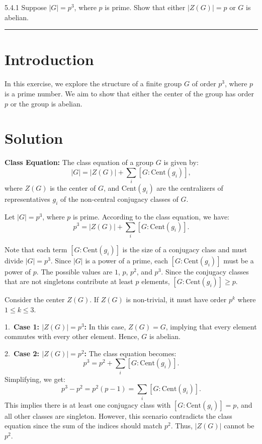 \documentclass[12pt]{amsart}
\theoremstyle{definition}
\numberwithin{equation}{section}
\begin{document}
\begin{exercise}{5.4.1} Suppose \(|G| = p^3\), where \(p\) is prime. Show that either \(|Z(G)|=p\) or \(G\) is abelian. 

    \noindent\rule{\linewidth}{1pt}

    \section*{Introduction}
    
    In this exercise, we explore the structure of a finite group \(G\) of order \(p^3\), where \(p\) is a prime number. We aim to show that either the center of the group has order \(p\) or the group is abelian.

    \section*{Solution}
    
    \noindent \textbf{Class Equation:} The class equation of a group \(G\) is given by:
    \[
    |G| = |Z(G)| + \sum_{i} [G : \text{Cent}(g_i)],
    \]
    where \(Z(G)\) is the center of \(G\), and \(\text{Cent}(g_i)\) are the centralizers of representatives \(g_i\) of the non-central conjugacy classes of \(G\).

    Let \(|G| = p^3\), where \(p\) is prime. According to the class equation, we have:
    \[
    p^3 = |Z(G)| + \sum_{i} [G : \text{Cent}(g_i)].
    \]

    Note that each term \([G : \text{Cent}(g_i)]\) is the size of a conjugacy class and must divide \(|G| = p^3\). Since \(|G|\) is a power of a prime, each \([G : \text{Cent}(g_i)]\) must be a power of \(p\). The possible values are \(1\), \(p\), \(p^2\), and \(p^3\). Since the conjugacy classes that are not singletons contribute at least \(p\) elements, \([G : \text{Cent}(g_i)] \geq p\).

    Consider the center \(Z(G)\). If \(Z(G)\) is non-trivial, it must have order \(p^k\) where \(1 \leq k \leq 3\). 

    1.\ \textbf{Case 1: \(|Z(G)| = p^3\):} In this case, \(Z(G) = G\), implying that every element commutes with every other element. Hence, \(G\) is abelian.

    2.\ \textbf{Case 2: \(|Z(G)| = p^2\):} The class equation becomes:
    \[
    p^3 = p^2 + \sum_{i} [G : \text{Cent}(g_i)].
    \]
    Simplifying, we get:
    \[
    p^3 - p^2 = p^2(p - 1) = \sum_{i} [G : \text{Cent}(g_i)].
    \]
    This implies there is at least one conjugacy class with \([G : \text{Cent}(g_i)] = p\), and all other classes are singleton. However, this scenario contradicts the class equation since the sum of the indices should match \(p^2\). Thus, \(|Z(G)|\) cannot be \(p^2\).


\end{exercise}
\end{document}
